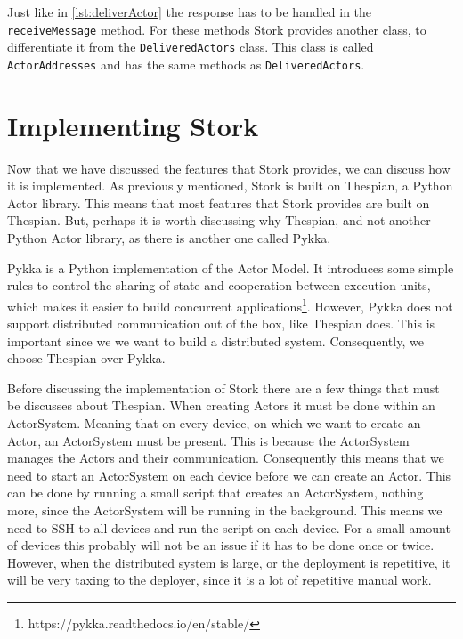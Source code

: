 \documentclass[a4paper]{article}
\begin{document}
Just like in \ref{lst:deliverActor} the response has to be handled in the \lstinline{receiveMessage} method. For these methods Stork provides another class, to differentiate it from the \lstinline|DeliveredActors| class. This class is called \lstinline|ActorAddresses| and has the same methods as \lstinline|DeliveredActors|.
\section{Implementing Stork}
Now that we have discussed the features that Stork provides, we can discuss how it is implemented. As previously mentioned, Stork is built on Thespian, a Python Actor library. This means that most features that Stork provides are built on Thespian. But, perhaps it is worth discussing why Thespian, and not another Python Actor library, as there is another one called Pykka.

Pykka is a Python implementation of the Actor Model. It introduces some simple rules to control the sharing of state and cooperation between execution units, which makes it easier to build concurrent applications\footnote{https://pykka.readthedocs.io/en/stable/}. However, Pykka does not support distributed communication out of the box, like Thespian does. This is important since we we want to build a distributed system. Consequently, we choose Thespian over Pykka.

Before discussing the implementation of Stork there are a few things that must be discusses about Thespian. When creating Actors it must be done within an ActorSystem. Meaning that on every device, on which we want to create an Actor, an ActorSystem must be present. This is because the ActorSystem manages the Actors and their communication. Consequently this means that we need to start an ActorSystem on each device before we can create an Actor. This can be done by running a small script that creates an ActorSystem, nothing more, since the ActorSystem will be running in the background. This means we need to SSH to all devices and run the script on each device. For a small amount of devices this probably will not be an issue if it has to be done once or twice. However, when the distributed system is large, or the deployment is repetitive, it will be very taxing to the deployer, since it is a lot of repetitive manual work.
\end{document}
